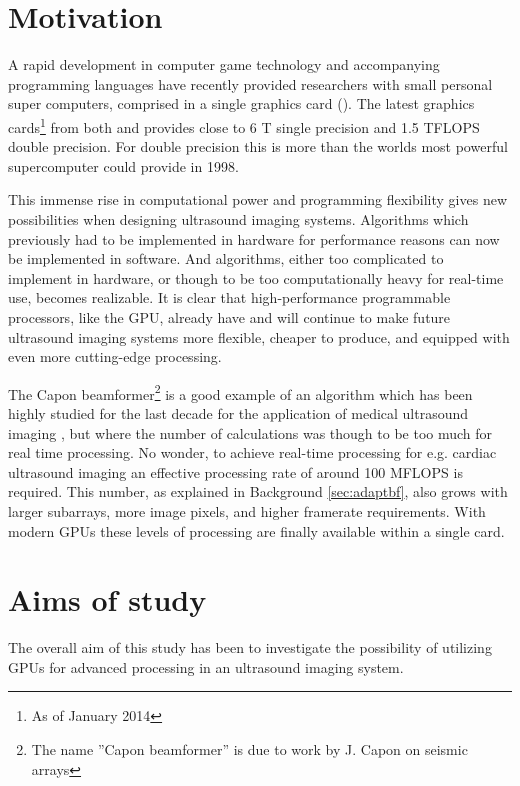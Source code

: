 \section{Motivation}
A rapid development in computer game technology and accompanying programming languages have recently provided researchers with small personal super computers, comprised in a single graphics card (). The latest graphics cards\footnote{As of January 2014} from both  and  provides close to 6 T single precision and 1.5 TFLOPS double precision. For double precision this is more than the worlds most powerful supercomputer could provide in 1998.

This immense rise in computational power and programming flexibility gives new possibilities when designing ultrasound imaging systems. Algorithms which previously had to be implemented in hardware for performance reasons can now be implemented in software. And algorithms, either too complicated to implement in hardware, or though to be too computationally heavy for real-time use, becomes realizable. It is clear that high-performance programmable processors, like the GPU, already have and will continue to make future ultrasound imaging systems more flexible, cheaper to produce, and equipped with even more cutting-edge processing.

The Capon beamformer\footnote{The name ''Capon beamformer'' is due to work by J. Capon  on seismic arrays }  is a good example of an algorithm which has been highly studied for the last decade for the application of medical ultrasound imaging , but where the number of calculations was though to be too much for real time processing. No wonder, to achieve real-time processing for e.g. cardiac ultrasound imaging an effective processing rate of around 100 MFLOPS is required. This number, as explained in Background \ref{sec:adaptbf}, also grows with larger subarrays, more image pixels, and higher framerate requirements.  With modern GPUs these levels of processing are finally available within a single card.

\section{Aims of study}
The overall aim of this study has been to investigate the possibility of utilizing GPUs for advanced processing in an ultrasound imaging system. 

